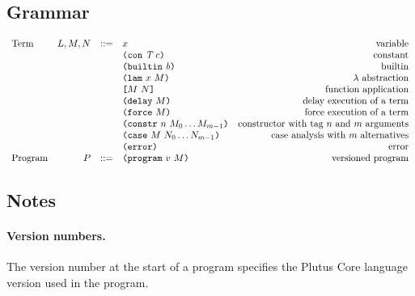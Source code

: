 \subsection{Grammar}
\begin{minipage}{\linewidth}
    \centering
    \[\begin{array}{lrclr}
    \textrm{Term}       & L,M,N  & ::= & x                               & \textrm{variable}\\
                        &        &     & \texttt{(} \texttt{con} ~ \textit{T} ~ c \texttt{)}                    & \textrm{constant}\\
                        &        &     & \texttt{(} \texttt{builtin} ~ \mathit{b} \texttt{)}                     & \textrm{builtin}\\
                        &        &     & \texttt{(} \texttt{lam} ~ x ~ M  \texttt{)}                     & \textrm{$\lambda$ abstraction}\\
                        &        &     & \texttt{[} M ~ N \texttt{]}                     & \textrm{function application}\\
                        &        &     & \texttt{(} \texttt{delay} ~ M \texttt{)}                       & \textrm{delay execution of a term}\\
                        &        &     & \texttt{(} \texttt{force} ~ M \texttt{)}                       & \textrm{force execution of a term}\\
                        &        &     & \texttt{(} \texttt{constr} ~ n ~ M_0 \ldots M_{m-1} \texttt{)}  & \textrm{constructor with tag $n$ and $m$ arguments}\\
                        &        &     & \texttt{(} \texttt{case} ~ M ~ N_0 \ldots N_{m-1} \texttt{)}    & \textrm{case analysis with $m$ alternatives}\\
                        &        &     & \texttt{(} \texttt{error} \texttt{)}                         & \textrm{error}\\
        \textrm{Program}& P      & ::= & \texttt{(} \texttt{program} ~ v ~ M \texttt{)}                  & \textrm{versioned program}

    \end{array}\]
    \label{fig:untyped-grammar}
\end{minipage}


\subsection{Notes}
\label{sec:grammar-notes}
\paragraph{Version numbers.} The version number at the start of a program specifies
the Plutus Core language version used in the program.

